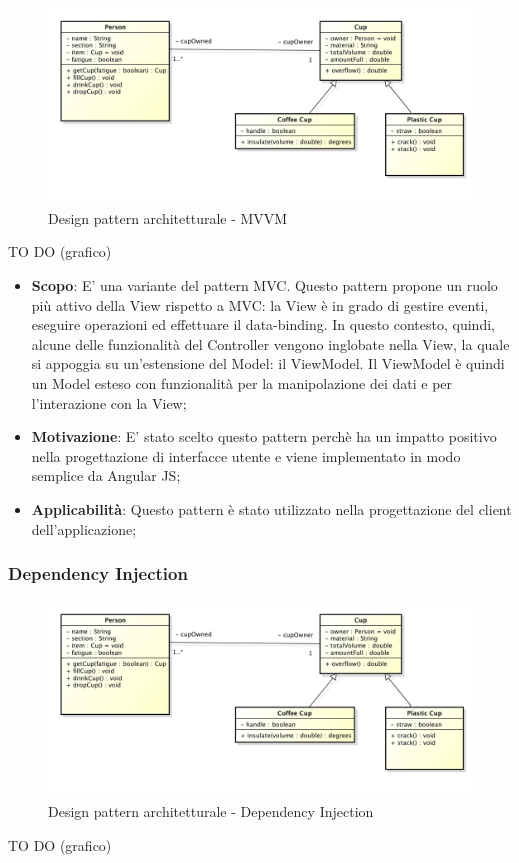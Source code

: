 		\begin{figure}[htbp]
			\centering
			\centerline{\includegraphics[scale=0.3]{./images/example_graph.png}}
			\caption{Design pattern architetturale - MVVM}
		\end{figure}
		TO DO (grafico)
		
		
		\begin{itemize}
			\item \textbf{Scopo}: E' una variante del pattern MVC. Questo pattern propone un ruolo più attivo della View rispetto a MVC: la View è in grado di gestire eventi, eseguire operazioni ed effettuare il data-binding. In questo contesto, quindi, alcune delle funzionalità del Controller vengono inglobate nella View, la quale si appoggia su un’estensione del Model: il ViewModel.
Il ViewModel è quindi un Model esteso con funzionalità per la manipolazione dei dati e per l’interazione con la View;
			
			\item \textbf{Motivazione}: E' stato scelto questo pattern perchè ha un impatto positivo nella progettazione di interfacce utente e viene implementato in modo semplice da Angular JS;
			
			\item \textbf{Applicabilità}: Questo pattern è stato utilizzato nella progettazione del client dell'applicazione;
			
		\end{itemize}
		
		
		\newpage
		\subsubsection{Dependency Injection} %
		
		\begin{figure}[htbp]
			\centering
			\centerline{\includegraphics[scale=0.3]{./images/example_graph.png}}
			\caption{Design pattern architetturale - Dependency Injection}
		\end{figure}
		TO DO (grafico)
		

